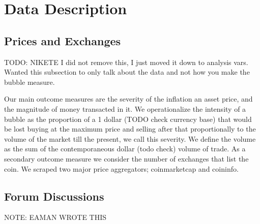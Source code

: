 \section{Data Description}



\subsection{Prices and Exchanges}
TODO: NIKETE I did not remove this, I just moved it down to analysis vars. Wanted this subsection
to only talk about the data and not how you make the bubble measure.

Our main outcome measures are the severity of the inflation an asset price, and the magnitude of money transacted in it.
We operationalize the intensity of a bubble as the proportion of a 1 dollar (TODO check currency base) that would be lost buying at the maximum price and selling after that proportionally to the volume of the market till the present, we call this severity.
We define the volume as the sum of the contemporaneous dollar (todo check) volume of trade.
As a secondary outcome measure we consider the number of exchanges that list the coin.
We scraped two major price aggregators; coinmarketcap and coininfo.


\subsection{Forum Discussions}
NOTE: EAMAN WROTE THIS

